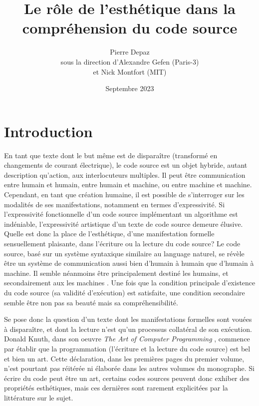 \documentclass{article}
\begin{document}
\title{Le rôle de l'esthétique dans la compréhension du code source}
\author{Pierre Depaz\\sous la direction d'Alexandre Gefen (Paris-3)\\et Nick Montfort (MIT)}
\date{Septembre 2023}
\maketitle

\section*{Introduction}

En tant que texte dont le but même est de disparaître (transformé en changements de courant électrique), le code source est un objet hybride, autant description qu'action, aux interlocuteurs multiples. Il peut être communication entre humain et humain, entre humain et machine, ou entre machine et machine. Cependant, en tant que création humaine, il est possible de s'interroger sur les modalités de ses manifestations, notamment en termes d'expressivité. Si l'expressivité fonctionnelle d'un code source implémentant un algorithme est indéniable, l'expressivité artistique d'un texte de code source demeure élusive. Quelle est donc la place de l'esthétique, d'une manifestation formelle sensuellement plaisante, dans l'écriture ou la lecture du code source? Le code source, basé sur un système syntaxique similaire au language naturel, se révèle être un système de communication aussi bien d'humain à humain que d'humain à machine. Il semble néanmoins être principalement destiné les humains, et secondairement aux les machines \citep{abelson_structure_1979}. Une fois que la condition principale d'existence du code source (sa validité d'exécution) est satisfaite, une condition secondaire semble être non pas sa beauté mais sa compréhensibilité.

Se pose donc la question d'un texte dont les manifestations formelles sont vouées à disparaître, et dont la lecture n'est qu'un processus collatéral de son exécution. Donald Knuth, dans son oeuvre \emph{The Art of Computer Programming} \citep{knuth_art_1997}, commence par établir que la programmation (l'écriture et la lecture du code source) est bel et bien un art. Cette déclaration, dans les premières pages du premier volume, n'est pourtant pas réitérée ni élaborée dans les autres volumes du monographe. Si écrire du code peut être un art, certains codes sources peuvent donc exhiber des propriétés esthétiques, mais ces dernières sont rarement explicitées par la littérature sur le sujet.
\end{document}
